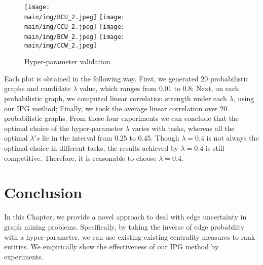 \documentclass[\main/thesis.tex]{subfiles}
\begin{document}
\begin{figure}
\texttt{[image: \\main/img/BCU\_2.jpeg]}
\texttt{[image: \\main/img/CCU\_2.jpeg]}
\texttt{[image: \\main/img/BCW\_2.jpeg]}
\texttt{[image: \\main/img/CCW\_2.jpeg]}
\caption{Hyper-parameter validation}
\label{hyper}
\end{figure}

Each plot is obtained in the following way. First, we generated 20 probabilistic graphs and candidate $\lambda$ value, which ranges from 0.01 to 0.8; Next, on each probabilistic graph, we computed linear correlation strength under each $\lambda$, using our IPG method; Finally, we took the average linear correlation over 20 probabilistic graphs. From these four experiments we can conclude that the optimal choice of the hyper-parameter $\lambda$ varies with tasks, whereas all the optimal $\lambda's$ lie in the interval from 0.25 to 0.45. Though $\lambda=0.4$ is not always the optimal choice in different tasks, the results achieved by $\lambda=0.4$ is still competitive. Therefore, it is reasonable to choose $\lambda=0.4$.

\section{Conclusion}
In this Chapter, we provide a novel approach to deal with edge uncertainty in graph mining problems. Specifically, by taking the inverse of edge probability with a hyper-parameter, we can use existing existing centrality measures to rank entities. We empirically show the effectiveness of our IPG method by experiments. %
\end{document}
